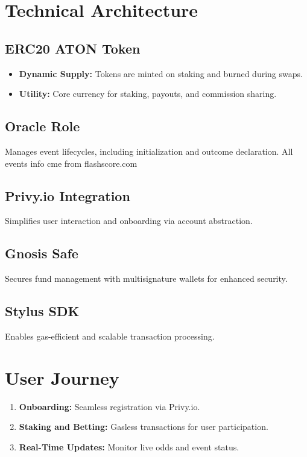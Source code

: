 \documentclass[11pt,twocolumn]{article}
\begin{document}
\section{Technical Architecture}
\subsection{ERC20 ATON Token}
\begin{itemize}[itemsep=0.5em]
    \item \textbf{Dynamic Supply:} Tokens are minted on staking and burned during swaps.
    \item \textbf{Utility:} Core currency for staking, payouts, and commission sharing.
\end{itemize}

\subsection{Oracle Role}
Manages event lifecycles, including initialization and outcome declaration.
All events info cme from flashscore.com 


\subsection{Privy.io Integration}
Simplifies user interaction and onboarding via account abstraction.

\subsection{Gnosis Safe}
Secures fund management with multisignature wallets for enhanced security.

\subsection{Stylus SDK}
Enables gas-efficient and scalable transaction processing.

\section{User Journey}
\begin{enumerate}[itemsep=0.5em]
    \item \textbf{Onboarding:} Seamless registration via Privy.io.
    \item \textbf{Staking and Betting:} Gasless transactions for user participation.
    \item \textbf{Real-Time Updates:} Monitor live odds and event status.
\end{enumerate}
\end{document}
